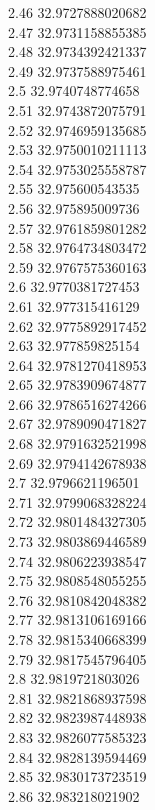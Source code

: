 {2.46	32.9727888020682\\
2.47	32.9731158855385\\
2.48	32.9734392421337\\
2.49	32.9737588975461\\
2.5	32.9740748774658\\
2.51	32.9743872075791\\
2.52	32.9746959135685\\
2.53	32.9750010211113\\
2.54	32.9753025558787\\
2.55	32.975600543535\\
2.56	32.975895009736\\
2.57	32.9761859801282\\
2.58	32.9764734803472\\
2.59	32.9767575360163\\
2.6	32.9770381727453\\
2.61	32.977315416129\\
2.62	32.9775892917452\\
2.63	32.977859825154\\
2.64	32.9781270418953\\
2.65	32.9783909674877\\
2.66	32.9786516274266\\
2.67	32.9789090471827\\
2.68	32.9791632521998\\
2.69	32.9794142678938\\
2.7	32.9796621196501\\
2.71	32.9799068328224\\
2.72	32.9801484327305\\
2.73	32.9803869446589\\
2.74	32.9806223938547\\
2.75	32.9808548055255\\
2.76	32.9810842048382\\
2.77	32.9813106169166\\
2.78	32.9815340668399\\
2.79	32.9817545796405\\
2.8	32.9819721803026\\
2.81	32.9821868937598\\
2.82	32.9823987448938\\
2.83	32.9826077585323\\
2.84	32.9828139594469\\
2.85	32.9830173723519\\
2.86	32.983218021902\\
}
